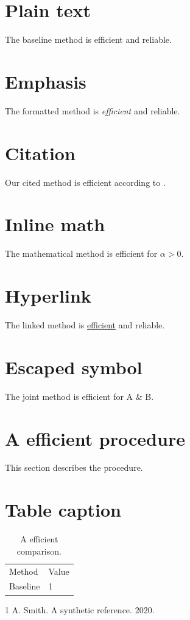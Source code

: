 \documentclass{article}
\begin{document}
\section{Plain text}
The baseline method is efficient and reliable.

\section{Emphasis}
The formatted method is \emph{efficient} and reliable.

\section{Citation}
Our cited method is efficient according to \cite{smith}.

\section{Inline math}
The mathematical method is efficient for $\alpha > 0$.

\section{Hyperlink}
The linked method is \href{https://example.org}{efficient} and reliable.

\section{Escaped symbol}
The joint method is efficient for A \& B.

\section{A efficient procedure}
This section describes the procedure.

\section{Table caption}
\begin{table}[h]\centering
\caption{A efficient comparison.}
\begin{tabular}{ll}Method & Value \\ Baseline & 1\end{tabular}
\end{table}

\begin{thebibliography}{1}
 A. Smith. A synthetic reference. 2020.
\end{thebibliography}
\end{document}

